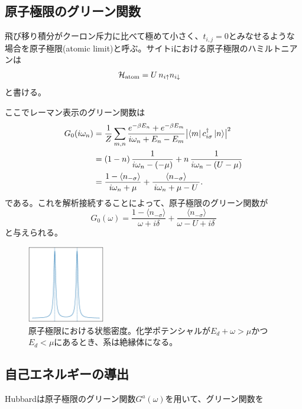 \documentclass[12pt]{jarticle}
\begin{document}
\subsection{原子極限のグリーン関数}
飛び移り積分がクーロン斥力に比べて極めて小さく、$t_{i,j} = 0$とみなせるような場合を原子極限(atomic limit)と呼ぶ。サイトiにおける原子極限のハミルトニアンは
\begin{align}
  \mathcal{H}_{\rm atom}
  &= U\,n_{i\uparrow}n_{i\downarrow}
\end{align}
と書ける。

ここでレーマン表示のグリーン関数は
\begin{align}
  G_0(i\omega_n)
  &= \frac{1}{Z}
     \sum_{m,n}
     \frac{e^{-\beta E_n} + e^{-\beta E_m}}
          {i\omega_n + E_n - E_m}
     \bigl|\langle m|\,c_{i\sigma}^\dagger\,|n\rangle\bigr|^2 \notag
  \\
  &= (1-n)\,\frac{1}{i\omega_n - ( -\mu )}
     + n\,\frac{1}{i\omega_n - (U-\mu)} \notag
  \\
  &= \frac{1-\langle n_{-\sigma} \rangle}{\,i\omega_n+\mu\,}
     +\frac{\langle n_{-\sigma} \rangle}{\,i\omega_n+\mu - U\,}.
\end{align}
である。これを解析接続することによって、原子極限のグリーン関数が
\begin{equation}
  G_0(\omega) = \frac{1-\langle n_{-\sigma} \rangle}{\omega + i\delta}
     +\frac{\langle n_{-\sigma} \rangle}{\omega - U+i\delta\,}
\end{equation}
と与えられる。

\begin{figure}[h]\label{fig:atomic-limit}
  \centering
  \includegraphics[width=0.3\textwidth]{dos_atomic_limit_square.eps}
  \caption{原子極限における状態密度。化学ポテンシャルが$E_d + \omega > \mu$かつ$E_d < \mu$にあるとき、系は絶縁体になる。}
\end{figure}

\subsection{自己エネルギーの導出}
Hubbardは原子極限のグリーン関数$G^a(\omega)$を用いて、グリーン関数を
\end{document}
